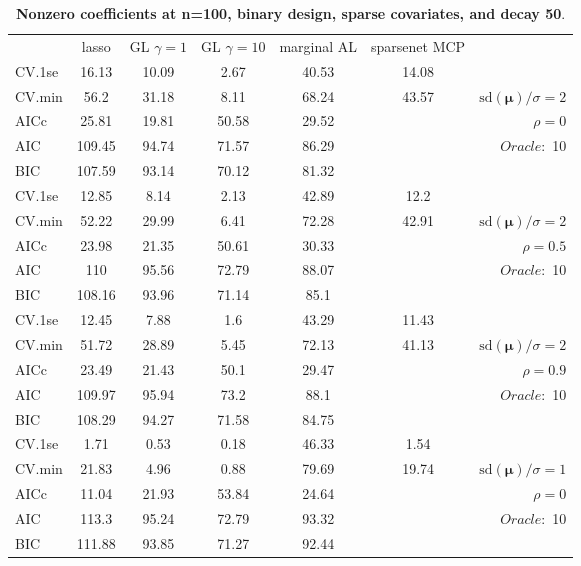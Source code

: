 \clearpage
\begin{table}\vspace{-.5cm}
\caption[l]{ { \bf Nonzero coefficients at n=100, binary design, 
sparse covariates, and  decay  50}.}
\vspace{-.5cm}
\footnotesize{}
\begin{center}
\begin{tabular}{l*{5}{c}|r}
& lasso & GL $\gamma=1$ & GL $\gamma=10$ & marginal AL & sparsenet MCP  & \\
 \cline{1-7}
CV.1se & 16.13 & 10.09 & 2.67 & 40.53 & 14.08 & \\
CV.min & 56.2 & 31.18 & 8.11 & 68.24 & 43.57 &  $\mathrm{sd}(\mathbf{\mu})/\sigma=2$ \\
AICc & 25.81 & 19.81 & 50.58 & 29.52 & & $\rho=0$ \\
AIC & 109.45 & 94.74 & 71.57 & 86.29 & &  \multirow{2}{*}{$Oracle: $ 10} \\
BIC & 107.59 & 93.14 & 70.12 & 81.32 & &  \\
 \hline 
CV.1se & 12.85 & 8.14 & 2.13 & 42.89 & 12.2 & \\
CV.min & 52.22 & 29.99 & 6.41 & 72.28 & 42.91 &  $\mathrm{sd}(\mathbf{\mu})/\sigma=2$ \\
AICc & 23.98 & 21.35 & 50.61 & 30.33 & & $\rho=0.5$ \\
AIC & 110 & 95.56 & 72.79 & 88.07 & &  \multirow{2}{*}{$Oracle: $ 10} \\
BIC & 108.16 & 93.96 & 71.14 & 85.1 & &  \\
 \hline 
CV.1se & 12.45 & 7.88 & 1.6 & 43.29 & 11.43 & \\
CV.min & 51.72 & 28.89 & 5.45 & 72.13 & 41.13 &  $\mathrm{sd}(\mathbf{\mu})/\sigma=2$ \\
AICc & 23.49 & 21.43 & 50.1 & 29.47 & & $\rho=0.9$ \\
AIC & 109.97 & 95.94 & 73.2 & 88.1 & &  \multirow{2}{*}{$Oracle: $ 10} \\
BIC & 108.29 & 94.27 & 71.58 & 84.75 & &  \\
 \hline 
CV.1se & 1.71 & 0.53 & 0.18 & 46.33 & 1.54 & \\
CV.min & 21.83 & 4.96 & 0.88 & 79.69 & 19.74 &  $\mathrm{sd}(\mathbf{\mu})/\sigma=1$ \\
AICc & 11.04 & 21.93 & 53.84 & 24.64 & & $\rho=0$ \\
AIC & 113.3 & 95.24 & 72.79 & 93.32 & &  \multirow{2}{*}{$Oracle: $ 10} \\
BIC & 111.88 & 93.85 & 71.27 & 92.44 & &  \\

\end{tabular}
\end{center}
\end{table}
